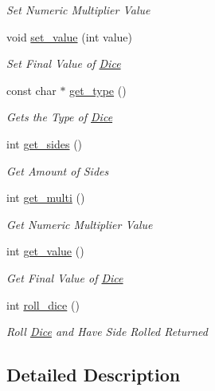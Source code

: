 \begin{DoxyCompactItemize}
\begin{DoxyCompactList}\small\item\em Set Numeric Multiplier Value \end{DoxyCompactList}\item 
void \mbox{\hyperlink{class_d_i_c_e_a6f2c5ce710807924ff8725de3b025cee}{set\+\_\+value}} (int value)
\begin{DoxyCompactList}\small\item\em Set Final Value of \mbox{\hyperlink{namespace_dice}{Dice}} \end{DoxyCompactList}\item 
const char $\ast$ \mbox{\hyperlink{class_d_i_c_e_aa586a0156a849209507b0bfac1304277}{get\+\_\+type}} ()
\begin{DoxyCompactList}\small\item\em Gets the Type of \mbox{\hyperlink{namespace_dice}{Dice}} \end{DoxyCompactList}\item 
int \mbox{\hyperlink{class_d_i_c_e_a6b6c5219c27de25a2b33a2c7dd432948}{get\+\_\+sides}} ()
\begin{DoxyCompactList}\small\item\em Get Amount of Sides \end{DoxyCompactList}\item 
int \mbox{\hyperlink{class_d_i_c_e_aa9ba66c4289c2facf5946fcf1b0017b2}{get\+\_\+multi}} ()
\begin{DoxyCompactList}\small\item\em Get Numeric Multiplier Value \end{DoxyCompactList}\item 
int \mbox{\hyperlink{class_d_i_c_e_a5957a4b479401d1c3d42efcef77bc44a}{get\+\_\+value}} ()
\begin{DoxyCompactList}\small\item\em Get Final Value of \mbox{\hyperlink{namespace_dice}{Dice}} \end{DoxyCompactList}\item 
int \mbox{\hyperlink{class_d_i_c_e_a89dcfe609f12904abf143b712c853f42}{roll\+\_\+dice}} ()
\begin{DoxyCompactList}\small\item\em Roll \mbox{\hyperlink{namespace_dice}{Dice}} and Have Side Rolled Returned \end{DoxyCompactList}\end{DoxyCompactItemize}


\subsection{Detailed Description}


